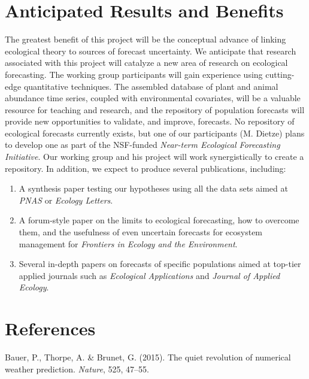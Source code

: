 \documentclass[12pt,]{article}
\providecommand{\tightlist}{%
  \setlength{\itemsep}{0pt}\setlength{\parskip}{0pt}}
\begin{document}
\section{Anticipated Results and Benefits}

The greatest benefit of this project will be the conceptual advance of
linking ecological theory to sources of forecast uncertainty. We
anticipate that research associated with this project will catalyze a
new area of research on ecological forecasting. The working group
participants will gain experience using cutting-edge quantitative
techniques. The assembled database of plant and animal abundance time
series, coupled with environmental covariates, will be a valuable
resource for teaching and research, and the repository of population
forecasts will provide new opportunities to validate, and improve,
forecasts. No repository of ecological forecasts currently exists, but
one of our participants (M. Dietze) plans to develop one as part of the
NSF-funded \emph{Near-term Ecological Forecasting Initiative}. Our
working group and his project will work synergistically to create a
repository. In addition, we expect to produce several publications,
including:

\begin{enumerate}
\def\labelenumi{\arabic{enumi}.}
\tightlist
\item
  A synthesis paper testing our hypotheses using all the data sets aimed
  at \emph{PNAS} or \emph{Ecology Letters}.
\item
  A forum-style paper on the limits to ecological forecasting, how to
  overcome them, and the usefulness of even uncertain forecasts for
  ecosystem management for \emph{Frontiers in Ecology and the
  Environment}.
\item
  Several in-depth papers on forecasts of specific populations aimed at
  top-tier applied journals such as \emph{Ecological Applications} and
  \emph{Journal of Applied Ecology}.
\end{enumerate}

\section*{References}\label{references}

\hypertarget{refs}{}
\hypertarget{ref-Bauer2015}{}
Bauer, P., Thorpe, A. \& Brunet, G. (2015). The quiet revolution of
numerical weather prediction. \emph{Nature}, 525, 47--55.
\end{document}
